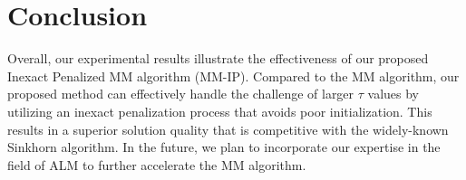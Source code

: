 \section{Conclusion}
Overall, our experimental results illustrate the effectiveness of our proposed Inexact Penalized MM algorithm (MM-IP). Compared to the MM algorithm, our proposed method can effectively handle the challenge of larger $\tau$ values by utilizing an inexact penalization process that avoids poor initialization. This results in a superior solution quality that is competitive with the widely-known Sinkhorn algorithm. In the future, we plan to incorporate our expertise in the field of ALM to further accelerate the MM algorithm.















